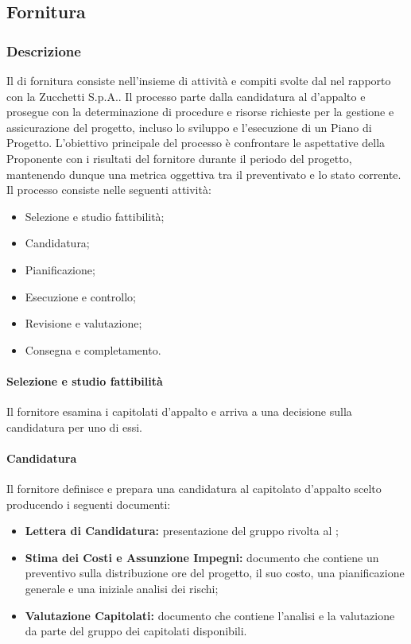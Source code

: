 \subsection{Fornitura}\label{fornitura}

\subsubsection{Descrizione}
Il  di fornitura consiste nell'insieme di attività e compiti svolte dal  nel rapporto con la  Zucchetti S.p.A.. Il processo parte dalla candidatura al  d'appalto e prosegue con la determinazione di procedure e risorse richieste per la gestione e assicurazione del progetto, incluso lo sviluppo e l'esecuzione di un Piano di Progetto.
L'obiettivo principale del processo è confrontare le aspettative della Proponente con i risultati del fornitore durante il periodo del progetto, mantenendo dunque una metrica oggettiva tra il preventivato e lo stato corrente.\\
Il processo consiste nelle seguenti attività:
\begin{itemize}
  \item Selezione e studio fattibilità;
  \item Candidatura;
  \item Pianificazione;
  \item Esecuzione e controllo;
  \item Revisione e valutazione;
  \item Consegna e completamento.
\end{itemize}

\paragraph{Selezione e studio fattibilità}
Il fornitore esamina i capitolati d'appalto e arriva a una decisione sulla candidatura per uno di essi.

\paragraph{Candidatura}
Il fornitore definisce e prepara una candidatura al capitolato d'appalto scelto producendo i seguenti documenti:
\begin{itemize}
  \item \textbf{Lettera di Candidatura:} presentazione del gruppo rivolta al ;
  \item \textbf{Stima dei Costi e Assunzione Impegni:} documento che contiene un preventivo sulla distribuzione ore del progetto, il suo costo, una pianificazione generale e una iniziale analisi dei rischi;
  \item \textbf{Valutazione Capitolati:} documento che contiene l'analisi e la valutazione da parte del gruppo dei capitolati disponibili.
\end{itemize}

